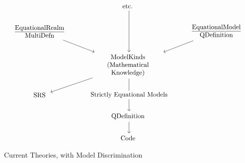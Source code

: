 
\begin{figure}[H]
\centering
\caption{Current Theories, with Model Discrimination}
\label{fig:theoriesWithModelKinds}

\[\begin{tikzcd}[align=center]
	& {etc.} \\
	{\parbox{3.5cm}{\centering \underline{EquationalRealm} MultiDefn}} &&
	{\parbox{3.5cm}{\centering \underline{EquationalModel} QDefinition}} \\
	& {\parbox{3.5cm}{\centering ModelKinds (Mathematical Knowledge)}} \\
	SRS \\
	& QDefinition \\
	& Code
	\arrow[from=2-3, to=3-2]
	\arrow[from=2-1, to=3-2]
	\arrow[from=1-2, to=3-2]
	\arrow[from=3-2, to=4-1]
	\arrow["{Strictly Equational Models}"{description}, from=3-2, to=5-2]
	\arrow[from=5-2, to=6-2]
\end{tikzcd}\]

\end{figure}

